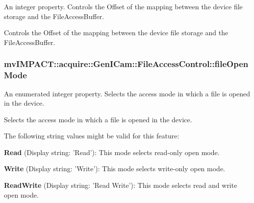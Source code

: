 An integer property. Controls the Offset of the mapping between the device file storage and the File\+Access\+Buffer. 

Controls the Offset of the mapping between the device file storage and the File\+Access\+Buffer. \hypertarget{classmv_i_m_p_a_c_t_1_1acquire_1_1_gen_i_cam_1_1_file_access_control_ab897a73644bac00e623b80287360fa7b}{
\subsubsection[{file\+Open\+Mode}]{ mv\+I\+M\+P\+A\+C\+T\+::acquire\+::\+Gen\+I\+Cam\+::\+File\+Access\+Control\+::file\+Open\+Mode}}\label{classmv_i_m_p_a_c_t_1_1acquire_1_1_gen_i_cam_1_1_file_access_control_ab897a73644bac00e623b80287360fa7b}


An enumerated integer property. Selects the access mode in which a file is opened in the device. 

Selects the access mode in which a file is opened in the device.

The following string values might be valid for this feature\+:
\begin{DoxyItemize}
\item {\bfseries Read} (Display string\+: 'Read')\+: This mode selects read-\/only open mode.
\item {\bfseries Write} (Display string\+: 'Write')\+: This mode selects write-\/only open mode.
\item {\bfseries Read\+Write} (Display string\+: 'Read Write')\+: This mode selects read and write open mode.
\end{DoxyItemize}

